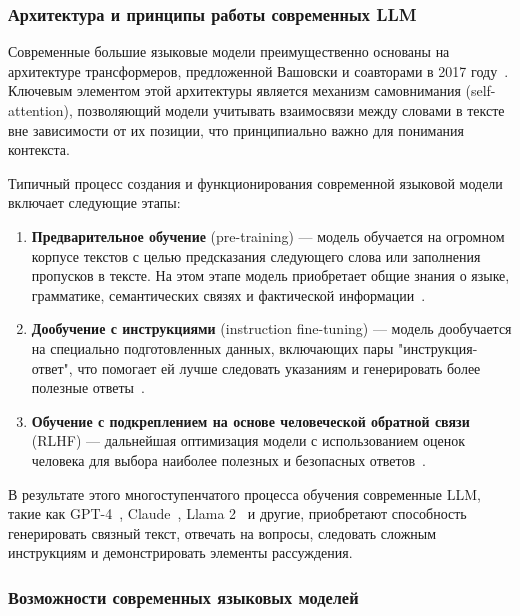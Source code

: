 \subsubsection{Архитектура и принципы работы современных LLM}

Современные большие языковые модели преимущественно основаны на архитектуре трансформеров, предложенной Вашовски и соавторами в 2017 году~\cite{vaswani2017attention}. Ключевым элементом этой архитектуры является механизм самовнимания (self-attention), позволяющий модели учитывать взаимосвязи между словами в тексте вне зависимости от их позиции, что принципиально важно для понимания контекста.

Типичный процесс создания и функционирования современной языковой модели включает следующие этапы:

\begin{enumerate}
    \item \textbf{Предварительное обучение} (pre-training) — модель обучается на огромном корпусе текстов с целью предсказания следующего слова или заполнения пропусков в тексте. На этом этапе модель приобретает общие знания о языке, грамматике, семантических связях и фактической информации~\cite{brown2020language}.

    \item \textbf{Дообучение с инструкциями} (instruction fine-tuning) — модель дообучается на специально подготовленных данных, включающих пары "инструкция-ответ", что помогает ей лучше следовать указаниям и генерировать более полезные ответы~\cite{wei2022finetuned}.

    \item \textbf{Обучение с подкреплением на основе человеческой обратной связи} (RLHF) — дальнейшая оптимизация модели с использованием оценок человека для выбора наиболее полезных и безопасных ответов~\cite{ouyang2022training}.
\end{enumerate}

В результате этого многоступенчатого процесса обучения современные LLM, такие как GPT-4~\cite{openai2023gpt4}, Claude~\cite{claude2023}, Llama 2~\cite{touvron2023llama} и другие, приобретают способность генерировать связный текст, отвечать на вопросы, следовать сложным инструкциям и демонстрировать элементы рассуждения.

\subsubsection{Возможности современных языковых моделей}

